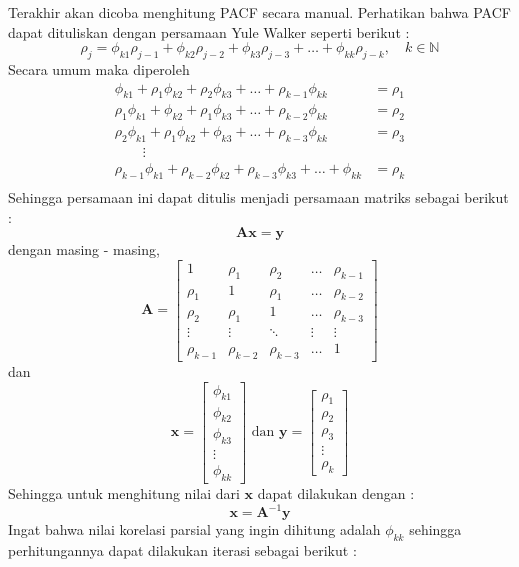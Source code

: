 \documentclass[
]{book}
\begin{document}
Terakhir akan dicoba menghitung PACF secara manual. Perhatikan bahwa PACF dapat dituliskan dengan persamaan Yule Walker seperti berikut :
\begin{equation}
\rho_j = \phi_{k1} \rho_{j-1} + \phi_{k2} \rho_{j-2}+ \phi_{k3} \rho_{j-3} +\dots +\phi_{kk} \rho_{j-k}, \quad k \in \mathbb{N}
\end{equation}
Secara umum maka diperoleh
\begin{align*}
\phi_{k1} + \rho_1 \phi_{k2} + \rho_2 \phi_{k3} + \dots + \rho_{k-1} \phi_{kk}&= \rho_1 \\
\rho_1\phi_{k1} +  \phi_{k2} + \rho_1 \phi_{k3} + \dots + \rho_{k-2} \phi_{kk}&= \rho_2 \\
\rho_2\phi_{k1} +  \rho_1 \phi_{k2} + \phi_{k3} + \dots + \rho_{k-3} \phi_{kk}&= \rho_3 \\
\quad \quad \vdots \\
\rho_{k-1}\phi_{k1} +  \rho_{k-2}\phi_{k2} + \rho_{k-3} \phi_{k3} + \dots +  \phi_{kk}&= \rho_k \\
\end{align*}
Sehingga persamaan ini dapat ditulis menjadi persamaan matriks sebagai berikut :
\begin{equation}
\mathbf{A}\mathbf{x} = \mathbf{y}
\end{equation}
dengan masing - masing,
\begin{equation} 
\mathbf{A} = 
\begin{bmatrix}
1 &\rho_1 & \rho_2 & \dots & \rho_{k-1} \\
\rho_1 & 1 & \rho_1 & \dots & \rho_{k-2} \\
\rho_2 & \rho_1 & 1 & \dots & \rho_{k-3} \\ 
\vdots & \vdots & \ddots & \vdots & \vdots \\ 
\rho_{k-1}& \rho_{k-2} & \rho_{k-3} & \dots &1 
\end{bmatrix} 
\end{equation}
dan
\begin{equation}
\mathbf{x}=
\begin{bmatrix}
\phi_{k1}\\
\phi_{k2}\\
\phi_{k3}\\ 
\vdots \\
\phi_{kk} 
\end{bmatrix} \text{ dan } 
\mathbf{y} = 
\begin{bmatrix}
\rho_1 \\
\rho_2 \\ 
\rho_3 \\
\vdots \\
\rho_k
\end{bmatrix} 
\end{equation}
Sehingga untuk menghitung nilai dari \(\mathbf{x}\) dapat dilakukan dengan :
\begin{equation}
\mathbf{x} = \mathbf{A}^{-1}\mathbf{y}
\end{equation}
Ingat bahwa nilai korelasi parsial yang ingin dihitung adalah \(\phi_{kk}\) sehingga perhitungannya dapat dilakukan iterasi sebagai berikut :
\end{document}
